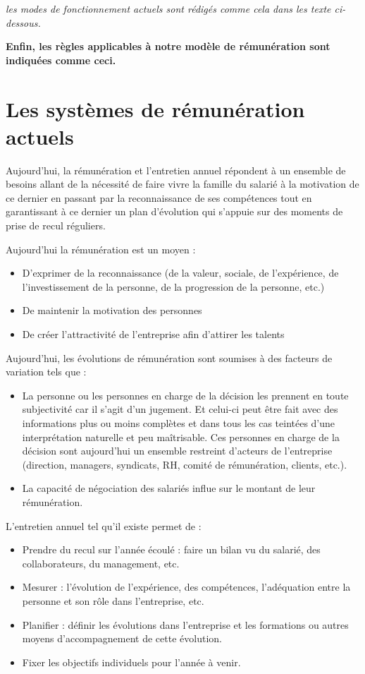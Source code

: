 \documentclass[12pt]{article}
\newcommand{\actuel}[1]{%
  \begin{tcolorbox}[colframe=DarkButter,boxrule=2pt,arc=4pt,left=6pt,right=6pt,top=6pt,bottom=6pt,boxsep=0pt,colback=Aluminium2]
    \textit{#1}
  \end{tcolorbox}
}
\newcommand{\regle}[1]{%
  \begin{tcolorbox}[colframe=DarkOrange,boxrule=2pt,arc=4pt,left=6pt,right=6pt,top=6pt,bottom=6pt,boxsep=0pt,colback=LightOrange]
  \textbf{#1}
  \end{tcolorbox}
}
\begin{document}
  \actuel{les modes de fonctionnement actuels sont rédigés comme cela dans les texte ci-dessous.}

  \regle{Enfin, les règles applicables à notre modèle de rémunération sont indiquées comme ceci.}

\section{Les systèmes de rémunération actuels}
 Aujourd’hui, la rémunération et l'entretien annuel répondent à un ensemble de besoins allant de la nécessité de faire vivre la famille du salarié à la motivation de ce dernier en passant par la reconnaissance de ses compétences tout en garantissant à ce dernier un plan d’évolution qui s’appuie sur des moments de prise de recul réguliers.

Aujourd’hui la rémunération est un moyen :
 \begin{itemize}
   \item D’exprimer de la reconnaissance (de la valeur, sociale, de l’expérience, de l’investissement de la personne, de la progression de la personne, etc.)
   \item De maintenir la motivation des personnes
   \item De créer l’attractivité de l’entreprise afin d’attirer les talents
 \end{itemize}

Aujourd’hui, les évolutions de rémunération sont soumises à des facteurs de variation tels que :
 \begin{itemize}
   \item La personne ou les personnes en charge de la décision les prennent en toute subjectivité car il s’agit d’un jugement. Et celui-ci peut être fait avec des informations plus ou moins complètes et dans tous les cas teintées d’une interprétation naturelle et peu maîtrisable. Ces personnes en charge de la décision sont aujourd’hui un ensemble restreint d’acteurs de l’entreprise (direction, managers, syndicats, RH, comité de rémunération, clients, etc.).
   \item La capacité de négociation des salariés influe sur le montant de leur rémunération.
 \end{itemize}

L'entretien annuel tel qu’il existe permet de : 
 \begin{itemize}
   \item Prendre du recul sur l’année écoulé : faire un bilan vu du salarié, des collaborateurs, du management, etc.
   \item Mesurer : l’évolution de l’expérience, des compétences, l’adéquation entre la personne et son rôle dans l’entreprise, etc.
   \item Planifier : définir les évolutions dans l’entreprise et les formations ou autres moyens d'accompagnement de cette évolution.
   \item Fixer les objectifs individuels pour l’année à venir. 
 \end{itemize}
\end{document}

